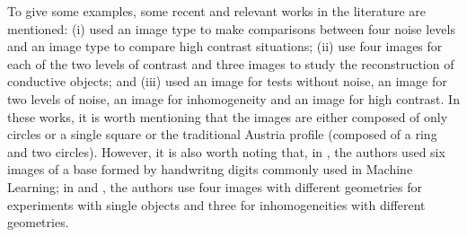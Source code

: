 			To give some examples, some recent and relevant works in the literature are mentioned: (i) \cite{zhong2020multiresolution} used an image type to make comparisons between four noise levels and an image type to compare high contrast situations; (ii) \cite{wei2019deep} use four images for each of the two levels of contrast and three images to study the reconstruction of conductive objects; and (iii) \cite{salucci2017multifrequency} used an image for tests without noise, an image for two levels of noise, an image for inhomogeneity and an image for high contrast. In these works, it is worth mentioning that the images are either composed of only circles or a single square or the traditional Austria profile (composed of a ring and two circles). However, it is also worth noting that, in \citep{wei2019deep}, the authors used six images of a base formed by handwritng digits commonly used in Machine Learning; in \citep{shah2018fast} and \citep{batista2021quadratic}, the authors use four images with different geometries for experiments with single objects and three for inhomogeneities with different geometries.
			
